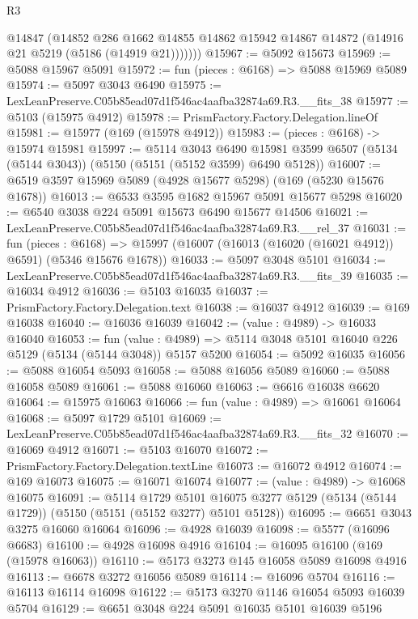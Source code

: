 \begin{lexlean}{R3}
\begin{coremodule}
          @14847
          (@14852
            @286
            @1662
            @14855
            @14862
            @15942
            @14867
            @14872
            (@14916 @21 @5219 (@5186 (@14919 @21)))))))
@15967 := @5092 @15673
@15969 := @5088 @15967 @5091
@15972 := fun (pieces : @6168) => @5088 @15969 @5089
@15974 := @5097 @3043 @6490
@15975 := LexLeanPreserve.C05b85ead07d1f546ac4aafba32874a69.R3.__fits_38
@15977 := @5103 (@15975 @4912)
@15978 := PrismFactory.Factory.Delegation.lineOf
@15981 := @15977 (@169 (@15978 @4912))
@15983 := (pieces : @6168) -> @15974 @15981
@15997 := @5114
    @3043
    @6490
    @15981
    @3599
    @6507
    (@5134 (@5144 @3043))
    (@5150 (@5151 (@5152 @3599) @6490 @5128))
@16007 := @6519 @3597 @15969 @5089 (@4928 @15677 @5298) (@169 (@5230 @15676 @1678))
@16013 := @6533 @3595 @1682 @15967 @5091 @15677 @5298
@16020 := @6540 @3038 @224 @5091 @15673 @6490 @15677 @14506
@16021 := LexLeanPreserve.C05b85ead07d1f546ac4aafba32874a69.R3.__rel_37
@16031 := fun (pieces : @6168) =>
  @15997 (@16007 (@16013 (@16020 (@16021 @4912)) @6591) (@5346 @15676 @1678))
@16033 := @5097 @3048 @5101
@16034 := LexLeanPreserve.C05b85ead07d1f546ac4aafba32874a69.R3.__fits_39
@16035 := @16034 @4912
@16036 := @5103 @16035
@16037 := PrismFactory.Factory.Delegation.text
@16038 := @16037 @4912
@16039 := @169 @16038
@16040 := @16036 @16039
@16042 := (value : @4989) -> @16033 @16040
@16053 := fun (value : @4989) =>
  @5114 @3048 @5101 @16040 @226 @5129 (@5134 (@5144 @3048)) @5157 @5200
@16054 := @5092 @16035
@16056 := @5088 @16054 @5093
@16058 := @5088 @16056 @5089
@16060 := @5088 @16058 @5089
@16061 := @5088 @16060
@16063 := @6616 @16038 @6620
@16064 := @15975 @16063
@16066 := fun (value : @4989) => @16061 @16064
@16068 := @5097 @1729 @5101
@16069 := LexLeanPreserve.C05b85ead07d1f546ac4aafba32874a69.R3.__fits_32
@16070 := @16069 @4912
@16071 := @5103 @16070
@16072 := PrismFactory.Factory.Delegation.textLine
@16073 := @16072 @4912
@16074 := @169 @16073
@16075 := @16071 @16074
@16077 := (value : @4989) -> @16068 @16075
@16091 := @5114
    @1729
    @5101
    @16075
    @3277
    @5129
    (@5134 (@5144 @1729))
    (@5150 (@5151 (@5152 @3277) @5101 @5128))
@16095 := @6651 @3043 @3275 @16060 @16064
@16096 := @4928 @16039
@16098 := @5577 (@16096 @6683)
@16100 := @4928 @16098 @4916
@16104 := @16095 @16100 (@169 (@15978 @16063))
@16110 := @5173 @3273 @145 @16058 @5089 @16098 @4916
@16113 := @6678 @3272 @16056 @5089
@16114 := @16096 @5704
@16116 := @16113 @16114 @16098
@16122 := @5173 @3270 @1146 @16054 @5093 @16039 @5704
@16129 := @6651 @3048 @224 @5091 @16035 @5101 @16039 @5196

\end{coremodule}
\end{lexlean}
